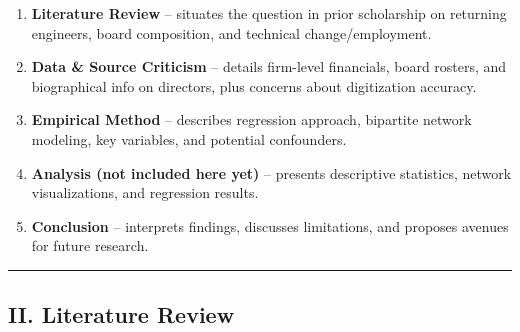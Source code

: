 \documentclass[
]{article}
\providecommand{\tightlist}{%
  \setlength{\itemsep}{0pt}\setlength{\parskip}{0pt}}\usepackage{longtable,booktabs,array}
\begin{document}
\begin{enumerate}
\begin{itemize}
    \begin{enumerate}
    \def\labelenumii{\arabic{enumii}.}
    \tightlist
    \item
      \textbf{Literature Review} -- situates the question in prior
      scholarship on returning engineers, board composition, and
      technical change/employment.\\
    \item
      \textbf{Data \& Source Criticism} -- details firm-level
      financials, board rosters, and biographical info on directors,
      plus concerns about digitization accuracy.\\
    \item
      \textbf{Empirical Method} -- describes regression approach,
      bipartite network modeling, key variables, and potential
      confounders.\\
    \item
      \textbf{Analysis (not included here yet)} -- presents descriptive
      statistics, network visualizations, and regression results.\\
    \item
      \textbf{Conclusion} -- interprets findings, discusses limitations,
      and proposes avenues for future research.
    \end{enumerate}
  \end{itemize}
\end{enumerate}

\begin{center}\rule{0.5\linewidth}{0.5pt}\end{center}

\subsection{II. Literature Review}\label{ii.-literature-review}
\end{document}
